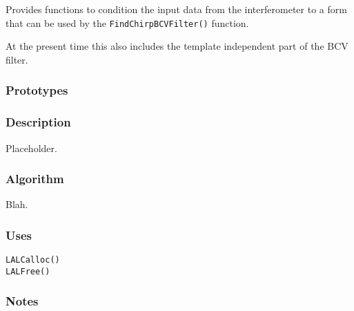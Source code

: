 Provides functions to condition the input data from the interferometer
to a form that can be used by the \texttt{FindChirpBCVFilter()} function.

At the present time this also includes the template independent part of the
BCV filter.

\subsubsection*{Prototypes}
\vspace{0.1in}


\subsubsection*{Description}

Placeholder.

\subsubsection*{Algorithm}

Blah.

\subsubsection*{Uses}
\begin{verbatim}
LALCalloc()
LALFree()
\end{verbatim}

\subsubsection*{Notes}

